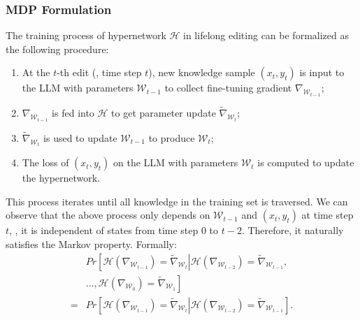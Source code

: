 \subsubsection{MDP Formulation}
The training process of hypernetwork $\mathcal{H}$ in lifelong editing can be formalized as the following procedure:
\begin{enumerate}
    \item At the $t$-th edit (\ie{}, time step $t$), new knowledge sample $(x_t,y_t)$ is input to the LLM with parameters $\mathcal{W}_{t-1}$ to collect fine-tuning gradient $\nabla_{\mathcal{W}_{t-1}}$;
    \item $\nabla_{\mathcal{W}_{t-1}}$ is fed into $\mathcal{H}$ to get parameter update $\tilde{\nabla}_{\mathcal{W}_t}$;
    \item $\tilde{\nabla}_{\mathcal{W}_t}$ is used to update $\mathcal{W}_{t-1}$ to produce $\mathcal{W}_t$;
    \item The loss of $(x_t,y_t)$ on the LLM with parameters $\mathcal{W}_t$ is computed to update the hypernetwork.
\end{enumerate}
This process iterates until all knowledge in the training set is traversed. We can observe that the above process only depends on $\mathcal{W}_{t-1}$ and $(x_t, y_t)$ at time step $t$, \ie, it is independent of states from time step $0$ to $t-2$. Therefore, it naturally satisfies the Markov property. Formally:
\begin{equation}
\begin{aligned}
& Pr\!\left[\mathcal{H}(\nabla_{\mathcal{W}_{t-1}}){=}\tilde{\nabla}_{\mathcal{W}_{t}}\!\left|\right.\mathcal{H}(\nabla_{\mathcal{W}_{t-2}}){=}\tilde{\nabla}_{\mathcal{W}_{t-1}},\right. \\
& \left.\dots,\mathcal{H}(\nabla_{\mathcal{W}_{0}}){=}\tilde{\nabla}_{\mathcal{W}_{1}}\right] \\
= & Pr\!\left[\mathcal{H}(\nabla_{\mathcal{W}_{t-1}}){=}\tilde{\nabla}_{\mathcal{W}_{t}}\!\left|\right.\mathcal{H}(\nabla_{\mathcal{W}_{t-2}}){=}\tilde{\nabla}_{\mathcal{W}_{t-1}}\right].
\end{aligned}
\end{equation}

